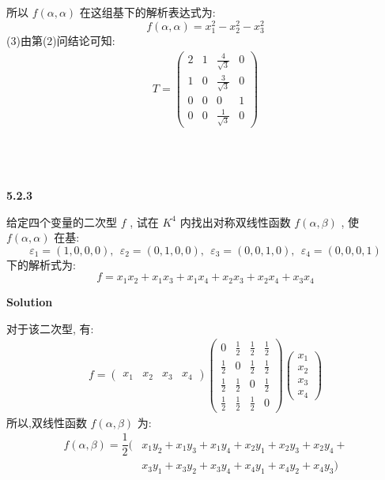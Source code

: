 \documentclass[11pt,a4paper,openany,oneside]{book}
\newcommand\Solution{\noindent\textbf{\textsf{Solution}}\par\medskip}
\begin{document}
所以 $ f(\alpha, \alpha) $ 在这组基下的解析表达式为:
 $$  f(\alpha, \alpha) = x_1^2 - x_2^2 - x_3^2  $$ 
(3)由第(2)问结论可知:
\begin{gather*}
T = 
\begin{pmatrix}
2  &  1  &  \tfrac{4}{\sqrt{3}} &  0  \\
1  &  0  &  \tfrac{3}{\sqrt{3}} &  0  \\
0  &  0  &  0  &  1  \\
0  &  0  &  \tfrac{1}{\sqrt{3}} & 0
\end{pmatrix}
\end{gather*} \\  \\  \\ 

\begin{myexample}
	\textbf{5.2.3}

给定四个变量的二次型 $ f $ , 试在 $ K^4 $ 内找出对称双线性函数 $ f(\alpha, \beta) $ , 使 $ f(\alpha, \alpha) $ 在基:
 $$  \varepsilon_1 = (1,0,0,0), \ \ \varepsilon_2=(0,1,0,0), \ \ \varepsilon_3 = (0,0,1,0), \ \ \varepsilon_4=(0,0,0,1)  $$ 
下的解析式为:
 $$  f=x_1x_2 + x_1x_3 + x_1x_4 + x_2x_3 + x_2x_4 + x_3x_4  $$ 

\end{myexample}
\Solution

对于该二次型, 有:
\begin{gather*}
f = 
\begin{pmatrix}
x_1  &  x_2  &  x_3  &  x_4  
\end{pmatrix}
\begin{pmatrix}
0            &  \frac{1}{2}  &  \frac{1}{2}  &  \frac{1}{2}  \\
\frac{1}{2}  &        0      &  \frac{1}{2}  &  \frac{1}{2}  \\
\frac{1}{2}  &  \frac{1}{2}  &       0       &  \frac{1}{2}  \\
\frac{1}{2}  &  \frac{1}{2}  &  \frac{1}{2}  &       0
\end{pmatrix}
\begin{pmatrix}
x_1 \\ x_2 \\ x_3 \\ x_4
\end{pmatrix}
\end{gather*}
所以,双线性函数 $ f(\alpha, \beta) $ 为:
\begin{align*} 
f(\alpha, \beta) = \dfrac{1}{2}(&x_1y_2 + x_1y_3 + x_1y_4 + x_2y_1 + x_2y_3 + x_2y_4 + \\
&x_3y_1 + x_3y_2 + x_3y_4 + x_4y_1 + x_4y_2 + x_4y_3) 
\end{align*} \\  \\  \\
\end{document}
